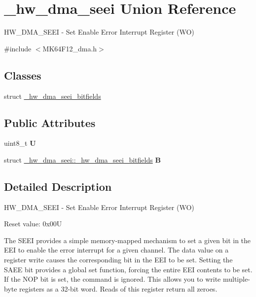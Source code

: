 \hypertarget{union__hw__dma__seei}{}\section{\+\_\+hw\+\_\+dma\+\_\+seei Union Reference}
\label{union__hw__dma__seei}


H\+W\+\_\+\+D\+M\+A\+\_\+\+S\+E\+EI -\/ Set Enable Error Interrupt Register (WO)  




{\ttfamily \#include $<$M\+K64\+F12\+\_\+dma.\+h$>$}

\subsection*{Classes}
\begin{DoxyCompactItemize}
\item 
struct \hyperlink{struct__hw__dma__seei_1_1__hw__dma__seei__bitfields}{\+\_\+hw\+\_\+dma\+\_\+seei\+\_\+bitfields}
\end{DoxyCompactItemize}
\subsection*{Public Attributes}
\begin{DoxyCompactItemize}
\item 
uint8\+\_\+t {\bfseries U}\hypertarget{union__hw__dma__seei_aa6b056e367b0593a8e3a6af01a1f5b4f}{}\label{union__hw__dma__seei_aa6b056e367b0593a8e3a6af01a1f5b4f}

\item 
struct \hyperlink{struct__hw__dma__seei_1_1__hw__dma__seei__bitfields}{\+\_\+hw\+\_\+dma\+\_\+seei\+::\+\_\+hw\+\_\+dma\+\_\+seei\+\_\+bitfields} {\bfseries B}\hypertarget{union__hw__dma__seei_af66658177b6b669abcdbab7eea846cec}{}\label{union__hw__dma__seei_af66658177b6b669abcdbab7eea846cec}

\end{DoxyCompactItemize}


\subsection{Detailed Description}
H\+W\+\_\+\+D\+M\+A\+\_\+\+S\+E\+EI -\/ Set Enable Error Interrupt Register (WO) 

Reset value\+: 0x00U

The S\+E\+EI provides a simple memory-\/mapped mechanism to set a given bit in the E\+EI to enable the error interrupt for a given channel. The data value on a register write causes the corresponding bit in the E\+EI to be set. Setting the S\+A\+EE bit provides a global set function, forcing the entire E\+EI contents to be set. If the N\+OP bit is set, the command is ignored. This allows you to write multiple-\/byte registers as a 32-\/bit word. Reads of this register return all zeroes. 

